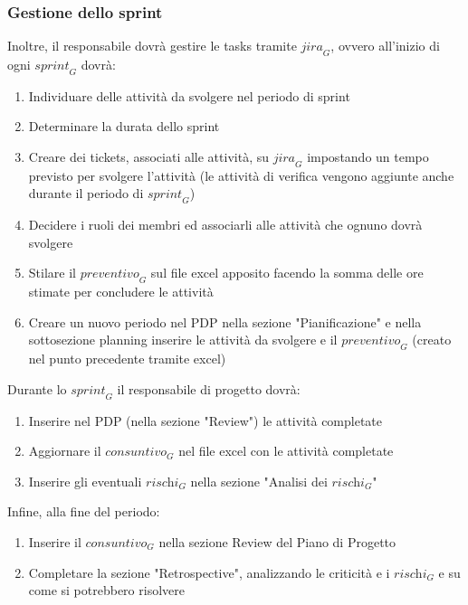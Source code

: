 \subsubsection{Gestione dello sprint}
Inoltre, il responsabile dovrà gestire le tasks tramite $\textit{jira}_G$, ovvero all'inizio di ogni $\textit{sprint}_G$ dovrà:
\begin{enumerate}
    \item Individuare delle attività da svolgere nel periodo di sprint
    \item Determinare la durata dello sprint
    \item Creare dei tickets, associati alle attività, su $\textit{jira}_G$ impostando un tempo previsto per svolgere l'attività (le attività di verifica vengono aggiunte anche durante il periodo di $\textit{sprint}_G$)
    \item Decidere i ruoli dei membri ed associarli alle attività che ognuno dovrà svolgere
    \item Stilare il $\textit{preventivo}_G$ sul file excel apposito facendo la somma delle ore stimate per concludere le attività
    \item Creare un nuovo periodo nel PDP nella sezione "Pianificazione" e nella sottosezione planning inserire le attività da svolgere e il $\textit{preventivo}_G$ (creato nel punto precedente tramite excel)
\end{enumerate}
Durante lo $\textit{sprint}_G$ il responsabile di progetto dovrà:
\begin{enumerate}
    \item Inserire nel PDP (nella sezione "Review") le attività completate
    \item Aggiornare il $\textit{consuntivo}_G$ nel file excel con le attività completate
    \item Inserire gli eventuali $\textit{rischi}_G$ nella sezione "Analisi dei $\textit{rischi}_G$"
\end{enumerate}
Infine, alla fine del periodo:
\begin{enumerate}
    \item Inserire il $\textit{consuntivo}_G$ nella sezione Review del Piano di Progetto
    \item Completare la sezione "Retrospective", analizzando le criticità e i $\textit{rischi}_G$ e su come si potrebbero risolvere
\end{enumerate}
